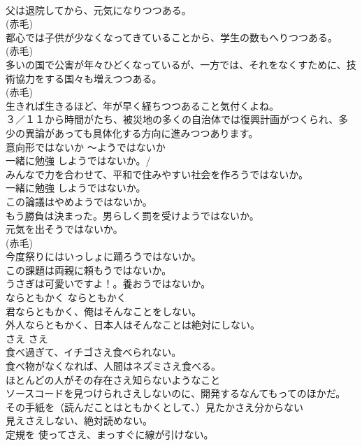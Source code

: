 \documentclass[8pt]{extreport}
\begin{document}
\begin{CJK}{UTF8}{min}
\\	父は退院してから、元気になりつつある。  
\\	(赤毛)
\\	都心では子供が少なくなってきていることから、学生の数もへりつつある。  
\\	(赤毛)
\\	多いの国で公害が年々ひどくなっているが、一方では、それをなくすために、技術協力をする国々も増えつつある。  
\\	(赤毛)
\\	生きれば生きるほど、年が早く経ちつつあること気付くよね。   
\\	３／１１から時間がたち、被災地の多くの自治体では復興計画がつくられ、多少の異論があっても具体化する方向に進みつつあります。   
\\	意向形ではないか	〜ようではないか	
\\	一緒に勉強 しようではないか。/ 
\\	みんなで力を合わせて、平和で住みやすい社会を作ろうではないか。  
\\	一緒に勉強 しようではないか。  
\\	この論議はやめようではないか。   
\\	もう勝負は決まった。男らしく罰を受けようではないか。   
\\	元気を出そうではないか。  
\\	(赤毛)
\\	今度祭りにはいっしょに踊ろうではないか。  
\\	この課題は両親に頼もうではないか。  
\\	うさぎは可愛いですよ！。養おうではないか。   
\\	ならともかく	ならともかく	
\\	君ならともかく、俺はそんなことをしない。  
\\	外人ならともかく、日本人はそんなことは絶対にしない。  
\\	さえ	さえ	
\\	食べ過ぎて、イチゴさえ食べられない。  
\\	食べ物がなくなれば、人間はネズミさえ食べる。  
\\	ほとんどの人がその存在さえ知らないようなこと  
\\	ソースコードを見つけられさえしないのに、開発するなんてもってのほかだ。  
\\	その手紙を（読んだことはともかくとして、）見たかさえ分からない  
\\	見えさえしない、絶対読めない。  
\\	定規を 使ってさえ、まっすぐに線が引けない。  

\end{CJK}
\end{document}
